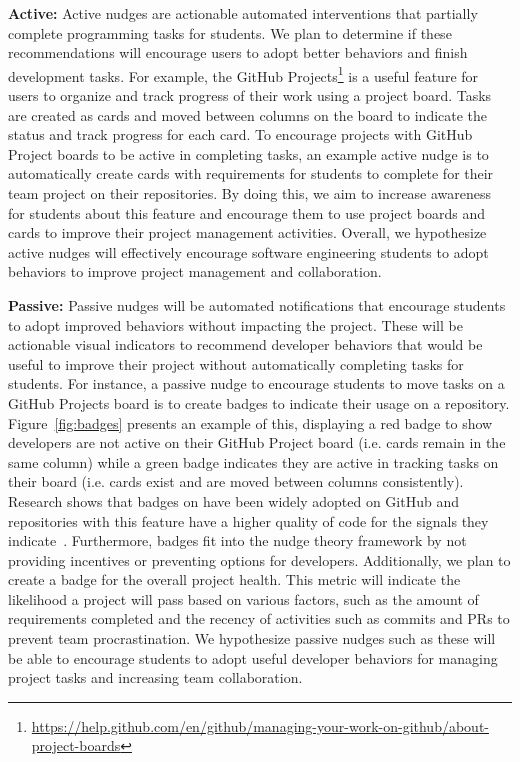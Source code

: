 \textbf{Active:} Active nudges are actionable automated interventions that partially complete programming tasks for students. We plan to determine if these recommendations will encourage users to adopt better behaviors and finish development tasks. For example, the GitHub Projects\footnote{\url{https://help.github.com/en/github/managing-your-work-on-github/about-project-boards}} is a useful feature for users to organize and track progress of their work using a project board. Tasks are created as cards and moved between columns on the board to indicate the status and track progress for each card. To encourage projects with GitHub Project boards to be active in completing tasks, an example active nudge is to automatically create cards with requirements for students to complete for their team project on their repositories. By doing this, we aim to increase awareness for students about this feature and encourage them to use project boards and cards to improve their project management activities. Overall, we hypothesize active nudges will effectively encourage software engineering students to adopt behaviors to improve project management and collaboration.

\textbf{Passive:} Passive nudges will be automated notifications that encourage students to adopt improved behaviors without impacting the project. These will be actionable visual indicators to recommend developer behaviors that would be useful to improve their project without automatically completing tasks for students. For instance, a passive nudge to encourage students to move tasks on a GitHub Projects board is to create badges to indicate their usage on a repository. Figure~\ref{fig:badges} presents an example of this, displaying a red badge to show developers are not active on their GitHub Project board (i.e. cards remain in the same column) while a green badge indicates they are active in tracking tasks on their board (i.e. cards exist and are moved between columns consistently). Research shows that badges on have been widely adopted on GitHub and repositories with this feature have a higher quality of code for the signals they indicate~\cite{trockman2018badges}. Furthermore, badges fit into the nudge theory framework by not providing incentives or preventing options for developers. Additionally, we plan to create a badge for the overall project health. This metric will indicate the likelihood a project will pass based on various factors, such as the amount of requirements completed and the recency of activities such as commits and PRs to prevent team procrastination. We hypothesize passive nudges such as these will be able to encourage students to adopt useful developer behaviors for managing project tasks and increasing team collaboration.

